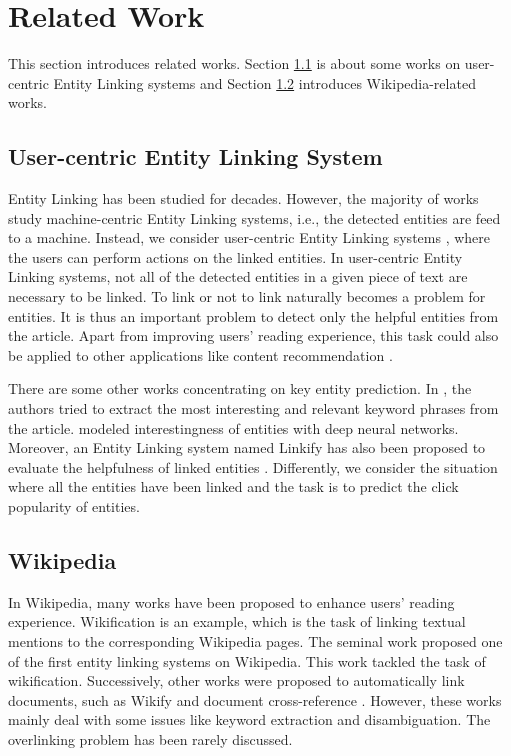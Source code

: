 \section{Related Work} 

This section introduces related works. Section \ref{related_1} is about some works on user-centric Entity Linking systems and Section \ref{related_2} introduces Wikipedia-related works.

\subsection{User-centric Entity Linking System} \label{related_1}

Entity Linking has been studied for decades. However, the majority of works study machine-centric Entity Linking systems, i.e., the detected entities are feed to a machine. Instead, we consider user-centric Entity Linking systems \cite{von2007leveraging}, where the users can perform actions on the linked entities. In user-centric Entity Linking systems, not all of the detected entities in a given piece of text are necessary to be linked. To link or not to link \cite{guo2013link} naturally becomes a problem for entities. It is thus an important problem to detect only the helpful entities from the article. Apart from improving users' reading experience, this task could also be applied to other applications like content recommendation \cite{joseph2019content}.

There are some other works concentrating on key entity prediction. In \cite{kraft2011contextual}, the authors tried to extract the most interesting and relevant keyword phrases from the article. \cite{gao2014modeling} modeled interestingness of entities with deep neural networks. Moreover, an Entity Linking system named Linkify has also been proposed to evaluate the helpfulness of linked entities \cite{yamada2018linkify, yamada2014evaluating}. Differently, we consider the situation where all the entities have been linked and the task is to predict the click popularity of entities.

\subsection{Wikipedia} \label{related_2}

In Wikipedia, many works have been proposed to enhance users' reading experience. Wikification is an example, which is the task of linking textual mentions to the corresponding Wikipedia pages. The seminal work \cite{cucerzan-2007-large} proposed one of the first entity linking systems on Wikipedia. This work tackled the task of wikification. Successively, other works were proposed to automatically link documents, such as Wikify \cite{csomai2008linking, mihalcea2007wikify} and document cross-reference \cite{milne2008learning}. However, these works mainly deal with some issues like keyword extraction and disambiguation. The overlinking problem has been rarely discussed. 

